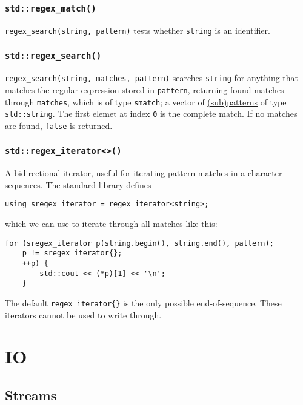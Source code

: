 \documentclass[8pt, table, xcdraw]{article}%
\begin{document}
\subsubsection{\lstinline{std::regex_match()}}

\lstinline{regex_search(string, pattern)} tests whether \lstinline{string} is an identifier.

\subsubsection{\lstinline{std::regex_search()}}

\lstinline{regex_search(string, matches, pattern)} searches \lstinline{string} for anything that matches the regular expression stored in \lstinline{pattern}, returning found matches through \lstinline{matches}, which is of type \lstinline{smatch}; a vector of \hyperref[subpatterns]{(sub)patterns} of type \lstinline{std::string}. The first elemet at index \lstinline{0} is the complete match. If no matches are found, \lstinline{false} is returned.

\subsubsection{\lstinline{std::regex_iterator<>()}}

A bidirectional iterator, useful for iterating pattern matches in a character sequences. The standard library defines

\begin{lstlisting}
using sregex_iterator = regex_iterator<string>;
\end{lstlisting}

which we can use to iterate through all matches like this:

\begin{lstlisting}
for (sregex_iterator p(string.begin(), string.end(), pattern);
    p != sregex_iterator{};
    ++p) {
        std::cout << (*p)[1] << '\n'; 
    }
\end{lstlisting}

The default \lstinline|regex_iterator{}| is the only possible end-of-sequence. These iterators cannot be used to write through.

\section{IO}

\subsection{Streams}
\end{document}
